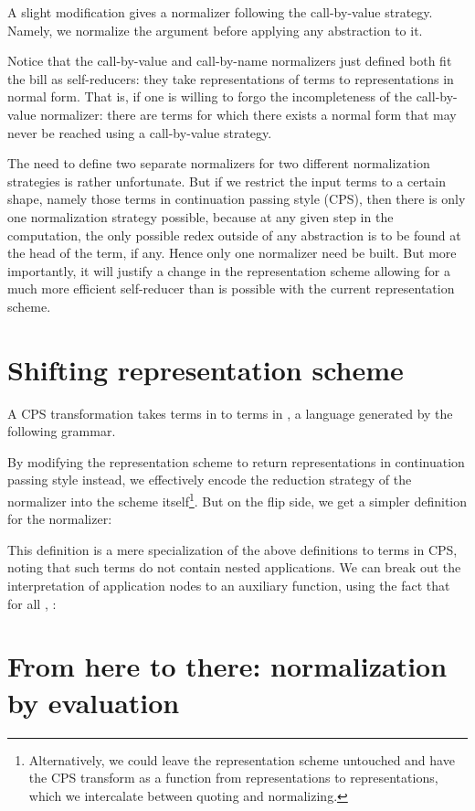 \documentclass[a4paper]{amsart}
\begin{document}
A slight modification gives a normalizer following the call-by-value strategy.
Namely, we normalize the argument before applying any abstraction to it.

Notice that the call-by-value and call-by-name normalizers just defined both
fit the bill as self-reducers: they take representations of terms to
representations in normal form. That is, if one is willing to forgo the
incompleteness of the call-by-value normalizer: there are terms for which
there exists a normal form that may never be reached using a call-by-value
strategy.

The need to define two separate normalizers for two different normalization
strategies is rather unfortunate. But if we restrict the input terms to a
certain shape, namely those terms in continuation passing style (CPS), then
there is only one normalization strategy possible, because at any given step
in the computation, the only possible redex outside of any abstraction is to
be found at the head of the term, if any. Hence only one normalizer need be
built. But more importantly, it will justify a change in the representation
scheme allowing for a much more efficient self-reducer than is possible with
the current representation scheme.

\section{Shifting representation scheme}

A CPS transformation takes terms in  to terms in , a language
generated by the following grammar.

By modifying the representation scheme to return representations in
continuation passing style instead, we effectively encode the reduction
strategy of the normalizer into the scheme itself\footnote{Alternatively, we
  could leave the representation scheme untouched and have the CPS transform
  as a function from representations to representations, which we intercalate
  between quoting and normalizing.}. But on the flip side, we get a simpler
definition for the normalizer:

This definition is a mere specialization of the above definitions to terms in
CPS, noting that such terms do not contain nested applications. We can break
out the interpretation of application nodes to an auxiliary  function,
using the fact that  for all , :


\section{From here to there: normalization by evaluation}
\end{document}
